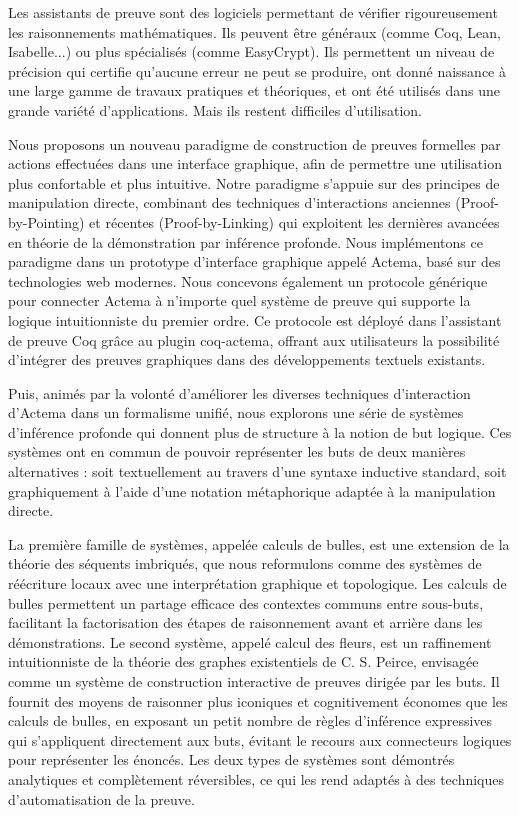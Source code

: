 Les assistants de preuve sont des logiciels permettant de vérifier
rigoureusement les raisonnements mathématiques. Ils peuvent être généraux (comme
Coq, Lean, Isabelle...) ou plus spécialisés (comme EasyCrypt). Ils permettent un
niveau de précision qui certifie qu'aucune erreur ne peut se produire, ont donné
naissance à une large gamme de travaux pratiques et théoriques, et ont été
utilisés dans une grande variété d'applications. Mais ils restent difficiles
d'utilisation.

Nous proposons un nouveau paradigme de construction de preuves formelles par
actions effectuées dans une interface graphique, afin de permettre une
utilisation plus confortable et plus intuitive. Notre paradigme s'appuie sur des
principes de manipulation directe, combinant des techniques d'interactions
anciennes (Proof-by-Pointing) et récentes (Proof-by-Linking) qui exploitent les
dernières avancées en théorie de la démonstration par inférence profonde. Nous
implémentons ce paradigme dans un prototype d'interface graphique appelé Actema,
basé sur des technologies web modernes. Nous concevons également un protocole
générique pour connecter Actema à n'importe quel système de preuve qui supporte
la logique intuitionniste du premier ordre. Ce protocole est déployé dans
l'assistant de preuve Coq grâce au plugin coq-actema, offrant aux utilisateurs
la possibilité d'intégrer des preuves graphiques dans des développements
textuels existants.

Puis, animés par la volonté d'améliorer les diverses techniques d'interaction
d'Actema dans un formalisme unifié, nous explorons une série de systèmes
d'inférence profonde qui donnent plus de structure à la notion de but logique.
Ces systèmes ont en commun de pouvoir représenter les buts de deux manières
alternatives : soit textuellement au travers d'une syntaxe inductive standard,
soit graphiquement à l'aide d'une notation métaphorique adaptée à la
manipulation directe.

La première famille de systèmes, appelée calculs de bulles, est une extension de
la théorie des séquents imbriqués, que nous reformulons comme des systèmes de
réécriture locaux avec une interprétation graphique et topologique. Les calculs
de bulles permettent un partage efficace des contextes communs entre sous-buts,
facilitant la factorisation des étapes de raisonnement avant et arrière dans les
démonstrations. Le second système, appelé calcul des fleurs, est un raffinement
intuitionniste de la théorie des graphes existentiels de C. S. Peirce, envisagée
comme un système de construction interactive de preuves dirigée par les buts. Il
fournit des moyens de raisonner plus iconiques et cognitivement économes que les
calculs de bulles, en exposant un petit nombre de règles d'inférence expressives
qui s'appliquent directement aux buts, évitant le recours aux connecteurs
logiques pour représenter les énoncés. Les deux types de systèmes sont démontrés
analytiques et complètement réversibles, ce qui les rend adaptés à des
techniques d'automatisation de la preuve.


